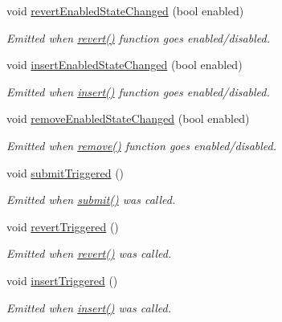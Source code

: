 \begin{DoxyCompactItemize}
void \hyperlink{classmdt_abstract_sql_widget_ada899f0c3f8388d2d3feac7c0c50884c}{revert\-Enabled\-State\-Changed} (bool enabled)
\begin{DoxyCompactList}\small\item\em Emitted when \hyperlink{classmdt_abstract_sql_widget_a3108b336f4c832cb0a5b3a830fff9ce0}{revert()} function goes enabled/disabled. \end{DoxyCompactList}\item 
void \hyperlink{classmdt_abstract_sql_widget_a909ba5b675f596ee5c5980e159cd2878}{insert\-Enabled\-State\-Changed} (bool enabled)
\begin{DoxyCompactList}\small\item\em Emitted when \hyperlink{classmdt_abstract_sql_widget_a850df045ea95b8c15ddd95ae771ef785}{insert()} function goes enabled/disabled. \end{DoxyCompactList}\item 
void \hyperlink{classmdt_abstract_sql_widget_a9c536f5081b321e8df24316506fc19f3}{remove\-Enabled\-State\-Changed} (bool enabled)
\begin{DoxyCompactList}\small\item\em Emitted when \hyperlink{classmdt_abstract_sql_widget_a748f85ff383d3f11fda4db7f931edb1c}{remove()} function goes enabled/disabled. \end{DoxyCompactList}\item 
void \hyperlink{classmdt_abstract_sql_widget_ab3bee735c32de34c0b097f1a426bafca}{submit\-Triggered} ()
\begin{DoxyCompactList}\small\item\em Emitted when \hyperlink{classmdt_abstract_sql_widget_a6678c45b0d46eb163f5b09d79ed001b5}{submit()} was called. \end{DoxyCompactList}\item 
void \hyperlink{classmdt_abstract_sql_widget_a4cd4617364c875c6c777cff1ce0187ae}{revert\-Triggered} ()
\begin{DoxyCompactList}\small\item\em Emitted when \hyperlink{classmdt_abstract_sql_widget_a3108b336f4c832cb0a5b3a830fff9ce0}{revert()} was called. \end{DoxyCompactList}\item 
void \hyperlink{classmdt_abstract_sql_widget_a87ca4a74a2d8073be3ae92d7215eb538}{insert\-Triggered} ()
\begin{DoxyCompactList}\small\item\em Emitted when \hyperlink{classmdt_abstract_sql_widget_a850df045ea95b8c15ddd95ae771ef785}{insert()} was called. \end{DoxyCompactList}\item 

\end{DoxyCompactItemize}
